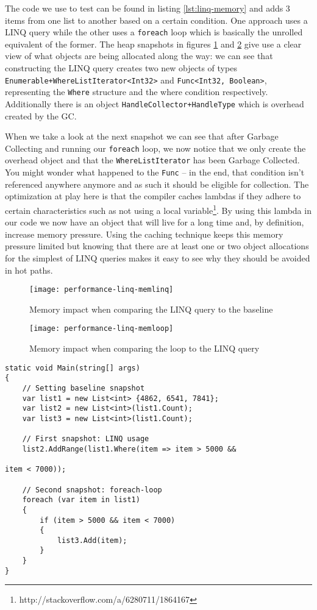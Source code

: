 The code we use to test can be found in listing \ref{lst:linq-memory} and adds 3 items from one list to another based on a certain condition. One approach uses a LINQ query while the other uses a \texttt{foreach} loop which is basically the unrolled equivalent of the former. The heap snapshots in figures \ref{img:performance-linq-memlinq} and \ref{img:performance-linq-memloop} give use a clear view of what objects are being allocated along the way: we can see that constructing the LINQ query creates two new objects of types \texttt{Enumerable+WhereListIterator<Int32>} and \texttt{Func<Int32, Boolean>}, representing the \texttt{Where} structure and the where condition respectively. Additionally there is an object \texttt{HandleCollector+HandleType} which is overhead created by the GC. 

When we take a look at the next snapshot we can see that after Garbage Collecting and running our \texttt{foreach} loop, we now notice that we only create the overhead object and that the \texttt{WhereListIterator} has been Garbage Collected. You might wonder what happened to the \texttt{Func} -- in the end, that condition isn't referenced anywhere anymore and as such it should be eligible for collection. The optimization at play here is that the compiler caches lambdas if they adhere to certain characteristics such as not using a local variable\footnote{http://stackoverflow.com/a/6280711/1864167}. By using this lambda in our code we now have an object that will live for a long time and, by definition, increase memory pressure. Using the caching technique keeps this memory pressure limited but knowing that there are at least one or two object allocations for the simplest of LINQ queries makes it easy to see why they should be avoided in hot paths.


\begin{figure}
\centering
\texttt{[image: performance-linq-memlinq]}
\caption{Memory impact when comparing the LINQ query to the baseline}
\label{img:performance-linq-memlinq}
\end{figure}

\begin{figure}[h]
\centering
\texttt{[image: performance-linq-memloop]}
\caption{Memory impact when comparing the loop to the LINQ query}
\label{img:performance-linq-memloop}
\end{figure}

\begin{lstlisting}[label={lst:linq-memory}]
static void Main(string[] args)
{
    // Setting baseline snapshot
    var list1 = new List<int> {4862, 6541, 7841};
    var list2 = new List<int>(list1.Count);
    var list3 = new List<int>(list1.Count);

    // First snapshot: LINQ usage
    list2.AddRange(list1.Where(item => item > 5000 && 
																			 item < 7000));

    // Second snapshot: foreach-loop
    foreach (var item in list1)
    {
        if (item > 5000 && item < 7000)
        {
            list3.Add(item);
        }
    }
}
\end{lstlisting}

